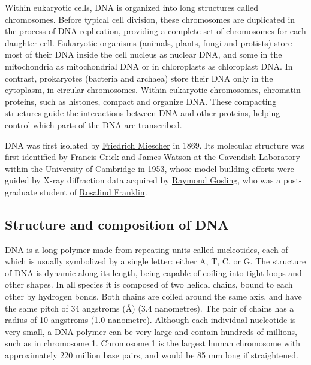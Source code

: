 Within eukaryotic cells, DNA is organized into long structures called chromosomes. Before typical cell division, these chromosomes are duplicated in the process of DNA replication, providing a complete set of chromosomes for each daughter cell. Eukaryotic organisms (animals, plants, fungi and protists) store most of their DNA inside the cell nucleus as nuclear DNA, and some in the mitochondria as mitochondrial DNA or in chloroplasts as chloroplast DNA. In contrast, prokaryotes (bacteria and archaea) store their DNA only in the cytoplasm, in circular chromosomes. Within eukaryotic chromosomes, chromatin proteins, such as histones, compact and organize DNA. These compacting structures guide the interactions between DNA and other proteins, helping control which parts of the DNA are transcribed.

DNA was first isolated by \href{https://en.wikipedia.org/wiki/Friedrich_Miescher}{Friedrich Miescher} in 1869. Its molecular structure was first identified by \href{https://en.wikipedia.org/wiki/Francis_Crick}{Francis Crick} and \href{https://en.wikipedia.org/wiki/James_Watson}{James Watson} at the Cavendish Laboratory within the University of Cambridge in 1953, whose model-building efforts were guided by X-ray diffraction data acquired by \href{https://en.wikipedia.org/wiki/Raymond_Gosling}{Raymond Gosling}, who was a post-graduate student of \href{https://en.wikipedia.org/wiki/Rosalind_Franklin}{Rosalind Franklin}.

\hypertarget{structure-and-composition-of-dna}{%
\subsection{Structure and composition of DNA}\label{structure-and-composition-of-dna}}

DNA is a long polymer made from repeating units called nucleotides, each of which is usually symbolized by a single letter: either A, T, C, or G. The structure of DNA is dynamic along its length, being capable of coiling into tight loops and other shapes. In all species it is composed of two helical chains, bound to each other by hydrogen bonds. Both chains are coiled around the same axis, and have the same pitch of 34 angstroms (Å) (3.4 nanometres). The pair of chains has a radius of 10 angstroms (1.0 nanometre). Although each individual nucleotide is very small, a DNA polymer can be very large and contain hundreds of millions, such as in chromosome 1. Chromosome 1 is the largest human chromosome with approximately 220 million base pairs, and would be 85 mm long if straightened.

